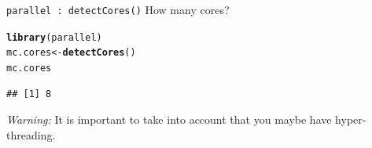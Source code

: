 \documentclass[aspectratio=169]{beamer}\usepackage[]{graphicx}\usepackage[]{color}
\makeatletter
\newcommand{\hlstd}[1]{\textcolor[rgb]{0.345,0.345,0.345}{#1}}%
\newcommand{\hlkwb}[1]{\textcolor[rgb]{0.69,0.353,0.396}{#1}}%
\newcommand{\hlkwd}[1]{\textcolor[rgb]{0.737,0.353,0.396}{\textbf{#1}}}%
\newenvironment{kframe}{%
 \def\at@end@of@kframe{}%
 \ifinner\ifhmode%
  \def\at@end@of@kframe{\end{minipage}}%
  \begin{minipage}{\columnwidth}%
 \fi\fi%
 \def\FrameCommand##1{\hskip\@totalleftmargin \hskip-\fboxsep
 \colorbox{shadecolor}{##1}\hskip-\fboxsep
     \hskip-\linewidth \hskip-\@totalleftmargin \hskip\columnwidth}%
 \MakeFramed {\advance\hsize-\width
   \@totalleftmargin\z@ \linewidth\hsize
   \@setminipage}}%
 {\par\unskip\endMakeFramed%
 \at@end@of@kframe}
\newenvironment{knitrout}{}{} %
\makeatother
\begin{document}
\begin{frame}[fragile]{\texttt{parallel : detectCores()}}
  How many cores?

\begin{knitrout}
\color{fgcolor}\begin{kframe}
\begin{alltt}
\hlkwd{library}\hlstd{(parallel)}
\hlstd{mc.cores} \hlkwb{<-} \hlkwd{detectCores}\hlstd{()}
\hlstd{mc.cores}
\end{alltt}
\begin{verbatim}
## [1] 8
\end{verbatim}
\end{kframe}
\end{knitrout}
  {\color{blue} \textit{Warning:} It is important to take into account that you maybe have hyper-threading.}
\end{frame}
\end{document}
